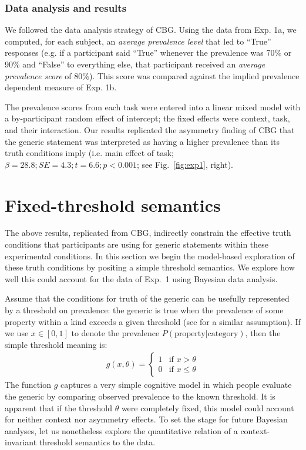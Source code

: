 \documentclass[10pt,letterpaper]{article}
\begin{document}
\subsubsection{Data analysis and results}
\label{subsec:cbganalysis}

%
We followed the data analysis strategy of CBG. Using the data from Exp. 1a, we computed, for each subject, an \emph{average prevalence level} that led to ``True'' responses (e.g. if a participant said ``True'' whenever the prevalence was 70\% or 90\% and ``False'' to everything else, that participant received an \emph{average prevalence score} of 80\%). This score was compared against the implied prevalence dependent measure of Exp. 1b. 

The prevalence scores from each task were entered into a linear mixed model with a by-participant random effect of intercept; the fixed effects were context, task, and their interaction. Our results replicated the asymmetry finding of CBG that the generic statement was interpreted as having a higher prevalence than its truth conditions imply (i.e. main effect of task; $\beta=28.8; SE = 4.3; t=6.6; p < 0.001$; see Fig.~\ref{fig:exp1}, right).

\section{Fixed-threshold semantics}
The above results, replicated from CBG, indirectly constrain the effective truth conditions that participants are using for generic statements within these experimental conditions. In this section we begin the model-based exploration of these truth conditions by positing a simple threshold semantics. We explore how well this could account for the data of Exp.~1 using Bayesian data analysis.

Assume that the conditions for truth of the generic can be usefully represented by a threshold on prevalence: the generic is true when the prevalence of some property within a kind exceeds a given threshold (see  for a similar assumption). If we use $x\in [0,1]$ to denote the prevalence $P(\text{property}|\text{category})$, then the simple threshold meaning is:
\begin{align}
 g(x, \theta) = \begin{cases}
   1 & \text{if } x > \theta \\
   0       & \text{if } x \leq \theta
  \end{cases}
   \label{eq:ftsem}
\end{align}
The function $g$ captures a very simple cognitive model in which people evaluate the generic by comparing observed prevalence to the known threshold.
It is apparent that if the threshold $\theta$ were completely fixed, this model could account for neither context nor asymmetry effects.
To set the stage for future Bayesian analyses, let us nonetheless explore the quantitative relation of a context-invariant threshold semantics to the data.
\end{document}
